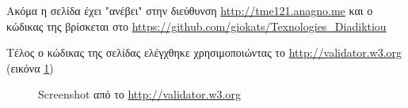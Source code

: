 \documentclass{assignment}
\begin{document}
\begin{Assignment}
\inputminted[linenos,tabsize=2]{html}{../../index.html}

\inputminted[linenos,tabsize=2]{css}{../../theme.css}

\inputminted[linenos,tabsize=2]{js}{../../javascript.js}

Ακόμα η σελίδα έχει "ανέβει" στην διεύθυνση \url{http://tme121.anagno.me}
και ο κώδικας της βρίσκεται στο \url{https://github.com/giokats/Texnologies_Diadiktiou}
\end{Assignment}

Τέλος ο κώδικας της σελίδας ελέγχθηκε χρησιμοποιώντας το \url{http://validator.w3.org} (εικόνα 
\ref{fig:date})

\begin{figure}
\begin{center}
\caption{Screenshot από το \url{http://validator.w3.org} }
\label{fig:date}
\end{center}
\end{figure}
\end{document}
